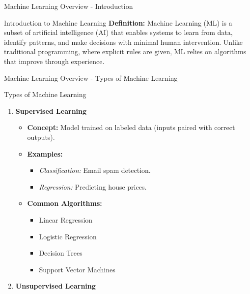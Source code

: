 \documentclass[aspectratio=169]{beamer}
\begin{document}
\begin{frame}[fragile]{Machine Learning Overview - Introduction}
    \begin{block}{Introduction to Machine Learning}
        \textbf{Definition:} 
        Machine Learning (ML) is a subset of artificial intelligence (AI) that enables systems to learn from data, identify patterns, and make decisions with minimal human intervention. Unlike traditional programming, where explicit rules are given, ML relies on algorithms that improve through experience.
    \end{block}
\end{frame}

\begin{frame}[fragile]{Machine Learning Overview - Types of Machine Learning}
    \begin{block}{Types of Machine Learning}
        \begin{enumerate}
            \item \textbf{Supervised Learning}
                \begin{itemize}
                    \item \textbf{Concept:} Model trained on labeled data (inputs paired with correct outputs).
                    \item \textbf{Examples:}
                        \begin{itemize}
                            \item \textit{Classification:} Email spam detection.
                            \item \textit{Regression:} Predicting house prices.
                        \end{itemize}
                    \item \textbf{Common Algorithms:}
                        \begin{itemize}
                            \item Linear Regression
                            \item Logistic Regression
                            \item Decision Trees
                            \item Support Vector Machines
                        \end{itemize}
                \end{itemize}
            \item \textbf{Unsupervised Learning}
                \begin{itemize}

\end{itemize}
\end{enumerate}
\end{block}
\end{frame}
\end{document}
